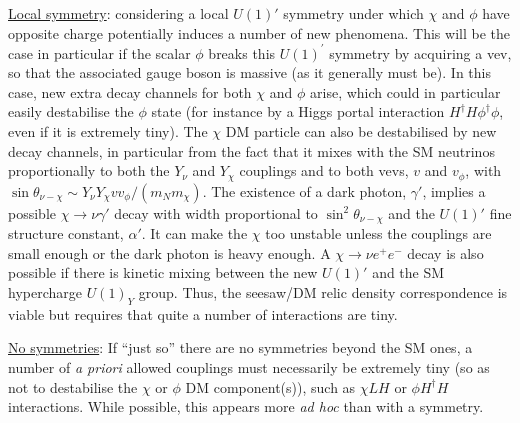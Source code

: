 \documentclass[prd,a4paper,twocolumn,preprintnumbers,nofootinbib,superscriptaddress]{revtex4}
\newcommand{\rupert}[1]{\textcolor{blue}{#1}}
\begin{document}
\underline{Local symmetry}: considering a local $U(1)'$ symmetry under which $\chi$ and $\phi$ have opposite charge potentially induces a number of new phenomena. This will be the case in particular if the scalar $\phi$ breaks this $U(1)^\prime$ symmetry by acquiring a vev, so that the associated gauge boson is massive (as it generally must be). In this case, new extra decay channels for both $\chi$ and $\phi$ arise, which could in particular easily destabilise the $\phi$ state
(for instance by a Higgs portal interaction $H^\dagger H \phi^\dagger\phi$, even if it is extremely tiny).
The $\chi$ DM particle can also be destabilised by new decay channels, in particular from the fact that it mixes with the SM neutrinos proportionally to both the $Y_\nu$ and $Y_\chi$ couplings and to both vevs, $v$ and $v_\phi$, with $\sin \theta_{\nu-\chi} \sim Y_\nu Y_\chi v v_\phi/(m_N m_\chi)$. 
The existence of a dark photon, $\gamma'$, implies a possible $\chi\rightarrow \nu \gamma'$ decay with width proportional to $\sin^2 \theta_{\nu-\chi}$ and the $U(1)'$ fine structure constant, $\alpha'$. It can make the $\chi$ too unstable unless the couplings are small enough or the dark photon is heavy enough.
A $\chi\rightarrow \nu e^+ e^-$ decay is also possible if there is kinetic mixing between the new $U(1)'$ and the SM hypercharge $U(1)_Y$ group. Thus, the seesaw/DM relic density correspondence is viable but requires that quite a number of interactions are tiny.
	
\underline{No symmetries}: If ``just so'' there are no symmetries beyond the SM ones, a number of \textit{a priori} allowed couplings must necessarily be extremely tiny (so as not to destabilise the $\chi$ or $\phi$ DM component(s)), such as $\chi LH$ or $\phi H^\dagger H$ interactions. While possible, this appears more \textit{ad hoc} than with a symmetry.
	
\end{document}
